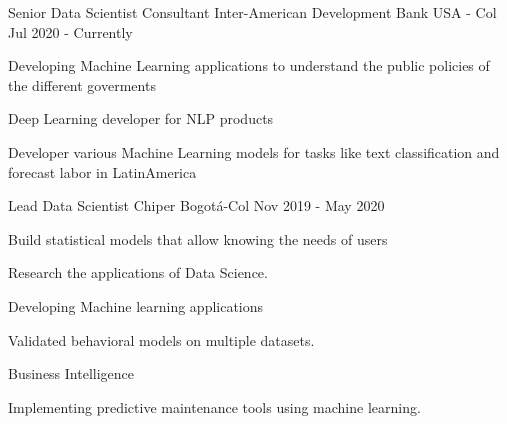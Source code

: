 

\begin{cventries}

\cventry
    {Senior Data Scientist Consultant} %
    {Inter-American Development Bank} %
    {USA - Col} %
    {Jul 2020 - Currently} %
    {
      \begin{cvitems} %
        \item {Developing Machine Learning applications to understand the public policies of the different goverments}
        \item {Deep Learning developer for NLP products}
        \item {Developer various Machine Learning models for tasks like text classification and forecast labor in LatinAmerica}
      \end{cvitems}
    }


  \cventry
    {Lead Data Scientist} %
    {Chiper} %
    {Bogotá-Col} %
    {Nov 2019 - May 2020} %
    {
      \begin{cvitems} %
        \item {Build statistical models that allow knowing the needs of users}
        \item {Research the applications of Data Science.}
        \item {Developing Machine learning applications}
        \item {Validated behavioral models on multiple datasets.}
        \item {Business Intelligence}
        \item{Implementing predictive maintenance tools using machine learning.}
      \end{cvitems}
    }

  

\end{cventries}
